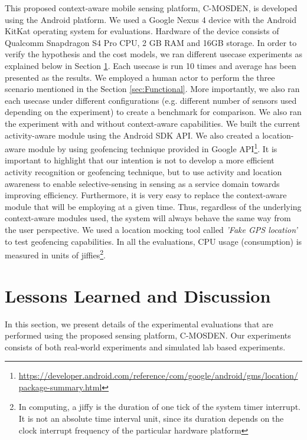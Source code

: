 \documentclass[journal]{IEEEtran}
\begin{document}
This proposed context-aware mobile sensing platform, C-MOSDEN, is developed using the Android platform. We used a Google Nexus 4 device with the Android KitKat operating system for evaluations. Hardware  of the device consists of Qualcomm Snapdragon S4 Pro CPU, 2 GB RAM and 16GB storage. In order to verify the hypothesis and the cost models, we ran different usecase experiments as explained below in Section \ref{sec:Evaluation}. Each usecase is run 10 times and average has been presented as the results. We employed a human actor to perform the three scenario mentioned in the Section \ref{sec:Functional}. More importantly, we also ran  each usecase under different configurations (e.g. different number of sensors used  depending on the experiment) to create a benchmark for comparison. We also ran the experiment with and without context-aware capabilities. We built the current activity-aware module using the Android SDK  API. We also created a location-aware module by using geofencing technique provided in Google API\footnote{\url{https://developer.android.com/reference/com/google/android/gms/location/package-summary.html}}. It is important to highlight  that our intention is not to develop a more efficient activity  recognition or geofencing technique, but to use activity and location awareness to enable selective-sensing in sensing as a service domain towards improving efficiency. Furthermore, it is very easy to replace the context-aware module that will be employing at a given time. Thus, regardless of the underlying context-aware modules used, the system will always behave the same way from the user perspective. We used a location mocking tool called \textit{'Fake GPS location'} to test geofencing capabilities. In all the evaluations, CPU usage (consumption) is measured in units of jiffies\footnote{In computing, a jiffy is the duration of one tick of the system timer interrupt. It is not an absolute time interval unit, since its duration depends on the clock interrupt frequency of the particular hardware platform}.



\section{Lessons Learned and Discussion}
\label{sec:Evaluation}

In this section, we present details of the  experimental evaluations that are  performed using the proposed sensing platform, C-MOSDEN. Our experiments consists of both real-world experiments and simulated lab based experiments.
\end{document}
